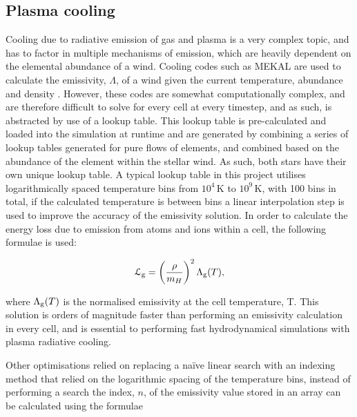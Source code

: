 \subsection{Plasma cooling}

Cooling due to radiative emission of gas and plasma is a very complex topic, and has to factor in multiple mechanisms of emission, which are heavily dependent on the elemental abundance of a wind.
Cooling codes such as MEKAL are used to calculate the emissivity, $\Lambda$, of a wind given the current temperature, abundance and density
\parencite{meweCalculatedXradiationOptically1985,meweCalculatedXradiationOptically1986}.
However, these codes are somewhat computationally complex, and are therefore difficult to solve for every cell at every timestep, and as such, is abstracted by use of a lookup table.
This lookup table is pre-calculated and loaded into the simulation at runtime and are generated by combining a series of lookup tables generated for pure flows of elements, and combined based on the abundance of the element within the stellar wind.
As such, both stars have their own unique lookup table.
A typical lookup table in this project utilises logarithmically spaced temperature bins from $10^4\,\si{\kelvin}$ to $10^9\,\si{\kelvin}$, with 100 bins in total, if the calculated temperature is between bins a linear interpolation step is used to improve the accuracy of the emissivity solution.
In order to calculate the energy loss due to emission from atoms and ions within a cell, the following formulae is used:

\begin{equation}
  \mathcal{L}_\text{g} = \left(\frac{\rho}{m_H}\right)^2 \Lambda_\text{g} (T) ,
\end{equation}

\noindent
where $\Lambda_\text{g}(T)$ is the normalised emissivity at the cell temperature, T.
This solution is orders of magnitude faster than performing an emissivity calculation in every cell, and is essential to performing fast hydrodynamical simulations with plasma radiative cooling.



Other optimisations relied on replacing a na\"ive linear search with an indexing method that relied on the logarithmic spacing of the temperature bins, instead of performing a search the index, $n$, of the emissivity value stored in an array can be calculated using the formulae

